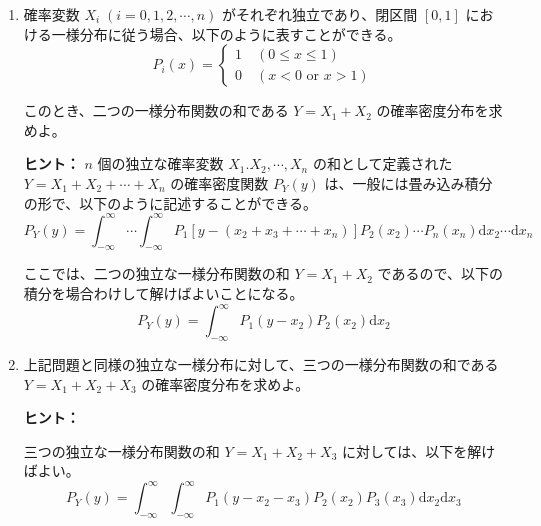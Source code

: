 \documentclass[uplatex,dvipdfmx,a4paper,11pt]{jsarticle}
\newcommand{\diff}{\mathrm d}
\begin{document}
\begin{enumerate}
\setlength{\parskip}{0cm} %
\setlength{\itemsep}{0.5cm} %

\item

確率変数 $X_i \; (i=0, 1, 2, \cdots, n)$ がそれぞれ独立であり、閉区間 $\left[0, 1 \right]$ における一様分布に従う場合、以下のように表すことができる。
\begin{equation*}
P_i(x) = 
\begin{cases}
1 \quad \text{$\left( 0 \leq x \leq 1 \right)$} \\
0 \quad \text{$\left( x < 0 \right. $ or  $\left. x > 1 \right)$}
\end{cases}
\end{equation*}

このとき、二つの一様分布関数の和である $Y=X_1 + X_2$ の確率密度分布を求めよ。

\begin{itembox}[l]{{\bf ヒント：}}
$n$ 個の独立な確率変数 $X_1. X_2, \cdots, X_n$ の和として定義された $Y = X_1 + X_2 +\cdots +X_n $ の確率密度関数 $P_Y(y)$ は、一般には畳み込み積分の形で、以下のように記述することができる。
\begin{equation*}
P_Y(y) = \int_{-\infty}^{\infty} \cdots \int_{-\infty}^{\infty} P_1[y-(x_2 + x_3 + \cdots +x_n)] P_2(x_2) \cdots P_n(x_n) \diff x_2 \cdots \diff x_n
\end{equation*}

ここでは、二つの独立な一様分布関数の和 $Y=X_1 + X_2$ であるので、以下の積分を場合わけして解けばよいことになる。
\begin{equation*}
P_Y(y) = \int_{-\infty}^{\infty} P_1(y - x_2) P_2(x_2) \diff x_2
\end{equation*}

\end{itembox}

\item

上記問題と同様の独立な一様分布に対して、三つの一様分布関数の和である $Y=X_1 + X_2 + X_3$ の確率密度分布を求めよ。

\begin{itembox}[l]{{\bf ヒント：}}

三つの独立な一様分布関数の和 $Y=X_1 + X_2+ X_3$ に対しては、以下を解けばよい。
\begin{equation*}
P_Y(y) = \int_{-\infty}^{\infty} \int_{-\infty}^{\infty} P_1(y - x_2 - x_3) P_2(x_2) P_3 (x_3) \diff x_2 \diff x_3
\end{equation*}


\end{itembox}
\end{enumerate}
\end{document}
